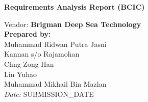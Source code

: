 

\thispagestyle{empty}



\begin{center}
	{\Huge\bfseries Requirements Analysis Report (BCIC)\\[0.8em]}
\end{center}

\vspace{2.5em}

\begin{flushleft}
Vendor: \textbf{Brigman Deep Sea Technology}\\[0.8em]
\textbf{Prepared by:}\\
Muhammad Ridwan Putra Jasni\\
Kannan s/o Rajamohan\\
Chng Zong Han\\
Lin Yuhao\\
Muhammad Mikhail Bin Mazlan\\[0.8em]
\textit{Date:} SUBMISSION\_DATE
\end{flushleft}

\newpage
